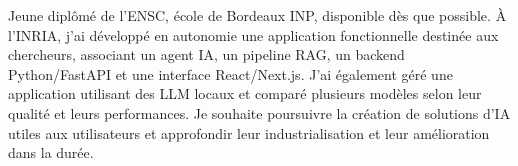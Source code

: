
\begin{cvparagraph}
Jeune diplômé de l’ENSC, école de Bordeaux INP, disponible dès que possible. À l’INRIA, j’ai développé en autonomie une application fonctionnelle destinée aux chercheurs, associant un agent IA, un pipeline RAG, un backend Python/FastAPI et une interface React/Next.js. J’ai également géré une application utilisant des LLM locaux et comparé plusieurs modèles selon leur qualité et leurs performances. Je souhaite poursuivre la création de solutions d’IA utiles aux utilisateurs et approfondir leur industrialisation et leur amélioration dans la durée.
\end{cvparagraph}
